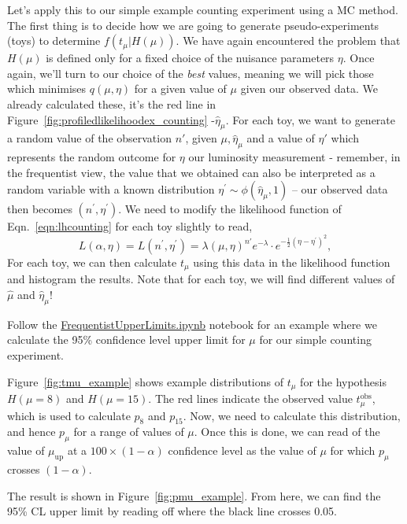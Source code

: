 Let's apply this to our simple example counting experiment using a MC method. The first thing is to decide how we are going to generate pseudo-experiments (toys) to determine $f(t_{\mu}|H(\mu))$. We have again encountered the problem that $H(\mu)$ is defined only for a fixed choice of the nuisance parameters $\eta$. Once again, we'll turn to our choice of the \emph{best} values, meaning we will pick those which minimises $q(\mu,\eta)$ for a given value of $\mu$ given our observed data. We already calculated these, it's the red line in Figure~\ref{fig:profiledlikelihoodex_counting} -$\hat{\eta}_{\mu}$. For each toy, we want to generate a random value of the observation $n'$, given $\mu,\hat{\eta}_{\mu}$ and a value of $\eta'$ which represents the random outcome for $\eta$ our luminosity measurement - remember, in the frequentist view, the value that we obtained can also be interpreted as a random variable with a known distribution $\eta{^{\prime}}\sim\phi(\hat{\eta}_{\mu},1)$ -- our observed data then becomes $(n^{\prime},\eta^{\prime})$. We need to modify the likelihood function of Eqn.~\ref{eqn:lhcounting} for each toy slightly to read, 
\begin{equation}
    L(\alpha,\eta) = L(n^{\prime},\eta^{\prime}) = \lambda(\mu,\eta)^{n\prime}e^{-\lambda}\cdot e^{-\frac{1}{2}(\eta-\eta^{\prime})^{2}},
\end{equation}
For each toy, we can then calculate $t_{\mu}$ using this data in the likelihood function and histogram the results. Note that for each toy, we will find different values of $\hat{\mu}$ and $\hat{\eta}_{\mu}$! 

Follow the \href{https://github.com/nucleosynthesis/PGStatistics/blob/main/notebooks/FrequentistUpperLimits.ipynb}{FrequentistUpperLimits.ipynb} notebook for an example where we calculate the 95\% confidence level upper limit for $\mu$ for our simple counting experiment. 

Figure~\ref{fig:tmu_example} shows example distributions of $t_{\mu}$ for the hypothesis $H(\mu=8)$ and $H(\mu=15)$. The red lines indicate the observed value $t_{\mu}^{\mathrm{obs}}$, which is used to calculate $p_{8}$ and $p_{15}$. Now, we need to calculate this distribution, and hence $p_{\mu}$ for a range of values of $\mu$. Once this is done, we can read of the value of $\mu_\mathrm{up}$ at a $100\times(1-\alpha)$ confidence level as the value of $\mu$ for which $p_{\mu}$ crosses $(1-\alpha)$. 

The result is shown in Figure~\ref{fig:pmu_example}. From here, we can find the 95\% CL upper limit by reading off where the black line crosses 0.05. 

